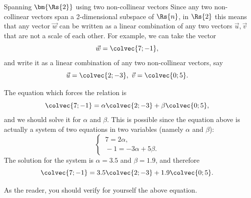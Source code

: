 \begin{example}{Spanning $\bm{\Rs{2}}$ using two non-collinear vectors}{}
	Since any two non-collinear vectors span a 2-dimensional subspace of $\Rs{n}$, in $\Rs{2}$ this means that any vector $\vec{w}$ can be written as a linear combination of any two vectors $\vec{u},\vec{v}$ that are not a scale of each other. For example, we can take the vector
	\[
		\vec{w} = \colvec{7;-1},
	\]
	and write it as a linear combination of any two non-collinear vectors, say
	\[
		\vec{u}=\colvec{2;-3},\ \vec{v}=\colvec{0;5}.
	\]

	The equation which forces the relation is
	\[
		\colvec{7;-1} = \alpha\colvec{2;-3} + \beta\colvec{0;5},
	\]
	and we should solve it for $\alpha$ and $\beta$. This is possible since the equation above is actually a system of two equations in two variables (namely $\alpha$ and $\beta$):
	\[
		\begin{cases}
			\ 7  = 2\alpha,\\
			\ -1 = -3\alpha + 5\beta.
		\end{cases}
	\]
	The solution for the system is $\alpha=3.5$ and $\beta=1.9$, and therefore
	\[
		\colvec{7;-1} = 3.5\colvec{2;-3} + 1.9\colvec{0;5}.
	\]
	
	As the reader, you should verify for yourself the above equation.
\end{example}

